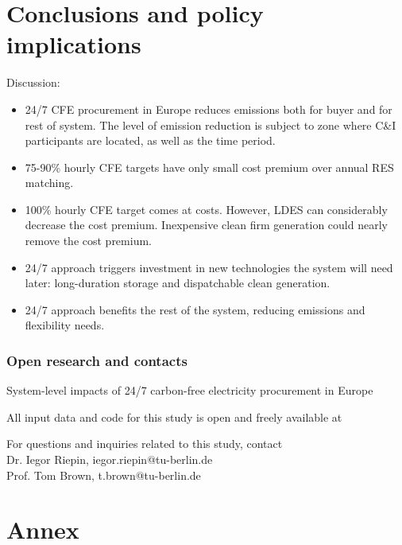 \section{Conclusions and policy implications}


\begin{frame}{Discussion:}

  \begin{itemize}
  \item 24/7 CFE procurement in Europe \alert{reduces emissions} both for buyer and for rest of system. The level of emission reduction is subject to zone where C\&I participants are located, as well as the time period.
  \item 75-90\% hourly CFE targets have \alert{only small cost premium} over annual RES matching.
  \item 100\% hourly CFE target \alert{comes at costs}. However, LDES can considerably decrease the cost premium. Inexpensive clean firm generation could nearly remove the cost premium.   
  \item 24/7 approach \alert{triggers investment in new technologies} the system will need later: long-duration storage and dispatchable clean generation.
  \item 24/7 approach \alert{benefits the rest of the system}, reducing emissions and flexibility needs.
  \end{itemize}

\end{frame}



\begin{frame}
  \frametitle{Open research and contacts}

  {\Large
  \alert{System-level impacts of 24/7 carbon-free electricity procurement in Europe}
  }

  \vspace{.3cm}
  All input data and code for this study is open and freely available at \\

  \vspace{.3cm}
  For questions and inquiries related to this study, contact \\
  Dr. Iegor Riepin, iegor.riepin@tu-berlin.de \\
  Prof. Tom Brown, t.brown@tu-berlin.de

\end{frame}


\section*{Annex}


